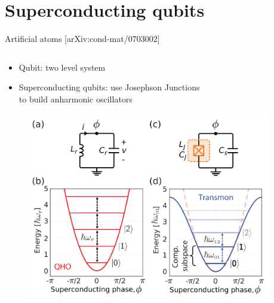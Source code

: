 \documentclass[aspectratio=169,10pt]{beamer}
\begin{document}
\section{Superconducting qubits}

\begin{frame}{Artificial atoms \hfill{\small[arXiv:cond-mat/0703002]}}
  \begin{columns}
    \begin{column}{0.6\textwidth}
      \centering
      \begin{itemize}
        \item<1-> Qubit: two level system
        \hspace{10 mm}
        \item<2-> Superconducting qubits: use Josephson Junctions\\ to build anharmonic oscillators
      \end{itemize}
      \begin{figure}
        \centering
        \includegraphics[height=0.5\textheight]{figures/Transmon.png}\\
      \end{figure}
    \end{column}
    \begin{column}{0.6\textwidth}
      \centering

\end{column}
\end{columns}
\end{frame}
\end{document}
